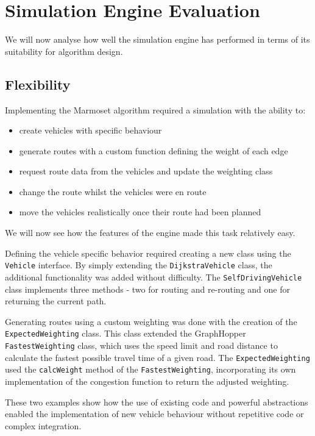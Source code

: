 \documentclass[ %
                    author={Alexander Hill},
                supervisor={Dr. Benjamin Sach},
                    degree={MEng},
                     title={MARMOSET},
                  subtitle={Multi-Agent Route Management using Online Simulation for Efficient Transportation},
                      type={research},
                      year={2016} ]{dissertation}
\begin{document}
\section{Simulation Engine Evaluation}\label{sec:simev}

We will now analyse how well the simulation engine has performed in terms
of its suitability for algorithm design.

\subsection{Flexibility}

Implementing the Marmoset algorithm required a simulation with the ability to:

\begin{itemize}
    \item create vehicles with specific behaviour
    \item generate routes with a custom function defining the weight of each edge
    \item request route data from the vehicles and update the weighting class
    \item change the route whilst the vehicles were en route
    \item move the vehicles realistically once their route had been planned
\end{itemize}

We will now see how the features of the engine made this task relatively easy.

Defining the vehicle specific behavior required creating a new class using the
\texttt{Vehicle} interface. By simply extending the \texttt{DijkstraVehicle}
class, the additional functionality was added without difficulty. The
\texttt{SelfDrivingVehicle} class implements three methods - two for routing and
re-routing and one for returning the current path.

Generating routes using a custom weighting was done with the creation of the
\texttt{ExpectedWeighting} class. This class extended the GraphHopper
\texttt{FastestWeighting} class, which uses the speed limit and road distance to
calculate the fastest possible travel time of a given road. The
\texttt{ExpectedWeighting} used the \texttt{calcWeight} method of the
\texttt{FastestWeighting}, incorporating its own implementation of the
congestion function to return the adjusted weighting.

These two examples show how the use of existing code and powerful abstractions
enabled the implementation of new vehicle behaviour without repetitive code or
complex integration.
\end{document}
